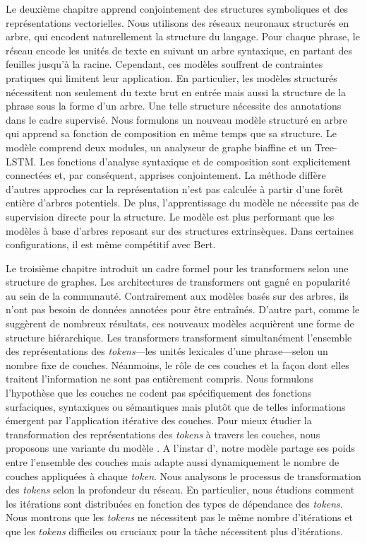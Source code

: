 Le deuxième chapitre apprend conjointement des structures symboliques et des représentations vectorielles. Nous utilisons des réseaux neuronaux structurés en arbre, qui encodent naturellement la structure du langage. Pour chaque phrase, le réseau encode les unités de texte en suivant un arbre syntaxique, en partant des feuilles jusqu'à la racine. Cependant, ces modèles souffrent de contraintes pratiques qui limitent leur application. En particulier, les modèles structurés nécessitent non seulement du texte brut en entrée mais aussi la structure de la phrase sous la forme d'un arbre. Une telle structure nécessite des annotations dans le cadre supervisé. Nous formulons un nouveau modèle structuré en arbre qui apprend sa fonction de composition en même temps que sa structure. Le modèle comprend deux modules, un analyseur de graphe biaffine et un Tree-LSTM. Les fonctions d'analyse syntaxique et de composition sont explicitement connectées et, par conséquent, apprises conjointement. La méthode diffère d’autres approches car la représentation n'est pas calculée à partir d’une forêt entière d'arbres potentiels. De plus, l'apprentissage du modèle ne nécessite pas de supervision directe pour la structure. Le modèle est plus performant que les modèles à base d'arbres reposant sur des structures extrinsèques. Dans certaines configurations, il est même compétitif avec Bert.

Le troisième chapitre introduit un cadre formel pour les transformers selon une structure de graphes. Les architectures de transformers ont gagné en popularité au sein de la communauté. Contrairement aux modèles basés sur des arbres, ils n'ont pas besoin de données annotées pour être entraînés. D'autre part, comme le suggèrent de nombreux résultats, ces nouveaux modèles acquièrent une forme de structure hiérarchique. Les transformers transforment simultanément l’ensemble des représentations des \textit{tokens}—les unités lexicales d’une phrase—selon un nombre fixe de couches. Néanmoins, le rôle de ces couches et la façon dont elles traitent l'information ne sont pas entièrement compris. Nous formulons l'hypothèse que les couches ne codent pas spécifiquement des fonctions surfaciques, syntaxiques ou sémantiques mais plutôt que de telles informations émergent par l'application itérative des couches. Pour mieux étudier la transformation des représentations des \textit{tokens} à travers les couches, nous proposons une variante du modèle \albert. A l’instar d’\albert, notre modèle partage ses poids entre l’ensemble des couches mais adapte aussi dynamiquement le nombre de couches appliquées à chaque \textit{token}. Nous analysons le processus de transformation des \textit{tokens} selon la profondeur du réseau. En particulier, nous étudions comment les itérations sont distribuées en fonction des types de dépendance des \textit{tokens}. Nous montrons que les \textit{tokens} ne nécessitent pas le même nombre d'itérations et que les \textit{tokens} difficiles ou cruciaux pour la tâche nécessitent plus d'itérations.

